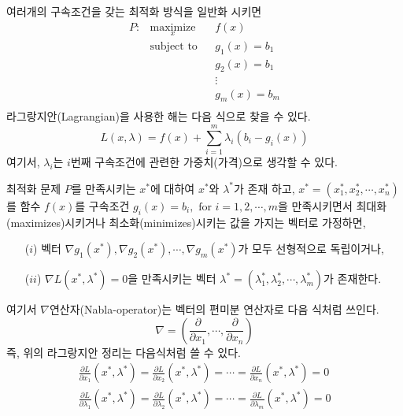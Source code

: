 여러개의 구속조건을 갖는 최적화 방식을 일반화 시키면
\begin{equation*}
\begin{aligned}
P : & \underset{x}{\text{maximize}}
& & f(x)\\
& \text{subject to}
& & g_{1}(x)=b_{1}\\
& & & g_{2}(x)=b_{1}\\
& & & \vdots\\
& & & g_{m}(x)=b_{m}\\
\end{aligned}
\end{equation*}
라그랑지안(Lagrangian)을 사용한 해는 다음 식으로 찾을 수 있다.
\begin{equation}
L(x,\lambda)=f(x)+\sum_{i=1}^{m}\lambda_{i}\left(b_{i}-g_{i}(x)\right)
\end{equation}
여기서, $\lambda_{i}$는 $i$번째 구속조건에 관련한 가중치(가격)으로 생각할 수 있다.
\begin{theorem}\label{theo:10-1}
최적화 문제 $P$를 만족시키는 $x^{*}$에 대하여 $x^{*}$와 $\lambda^{*}$가 존재 하고,
$x^{*}=\left(x_{1}^{*},x_{2}^{*},\cdots,x_{n}^{*}\right)$를 함수 $f(x)$를 구속조건 $g_{i}(x)=b_{i},\text{ for }i=1,2,\cdots,m$을 만족시키면서 최대화(maximizes)시키거나 최소화(minimizes)시키는 값을 가지는 벡터로 가정하면,
\begin{itemize}
\item[($i$)] 벡터 $\nabla g_{1}(x^{*}),\nabla g_{2}(x^{*}),\cdots,\nabla g_{m}(x^{*})$가 모두 선형적으로 독립이거나,
\item[($ii$)] $\nabla L(x^{*},\lambda^{*})=0$을 만족시키는 벡터 $\lambda^{*}=\left(\lambda_{1}^{*},\lambda_{2}^{*},\cdots,\lambda_{m}^{*}\right)$가 존재한다.
\end{itemize}
여기서 $\nabla$연산자(Nabla-operator)는 벡터의 편미분 연산자로 다음 식처럼 쓰인다.
\begin{equation}
\nabla = \left(\frac{\partial}{\partial x_{1}},\cdots,\frac{\partial}{\partial x_{n}}\right)
\end{equation}
즉, 위의 라그랑지안 정리는 다음식처럼 쓸 수 있다.
\begin{align}
\frac{\partial L}{\partial x_{1}}\left(x^{*},\lambda^{*}\right)=\frac{\partial L}{\partial x_{2}}\left(x^{*},\lambda^{*}\right)=\cdots=\frac{\partial L}{\partial x_{n}}\left(x^{*},\lambda^{*}\right)=0\\
\frac{\partial L}{\partial \lambda_{1}}\left(x^{*},\lambda^{*}\right)=\frac{\partial L}{\partial \lambda_{2}}\left(x^{*},\lambda^{*}\right)=\cdots=\frac{\partial L}{\partial \lambda_{m}}\left(x^{*},\lambda^{*}\right)=0
\end{align}
\end{theorem}


